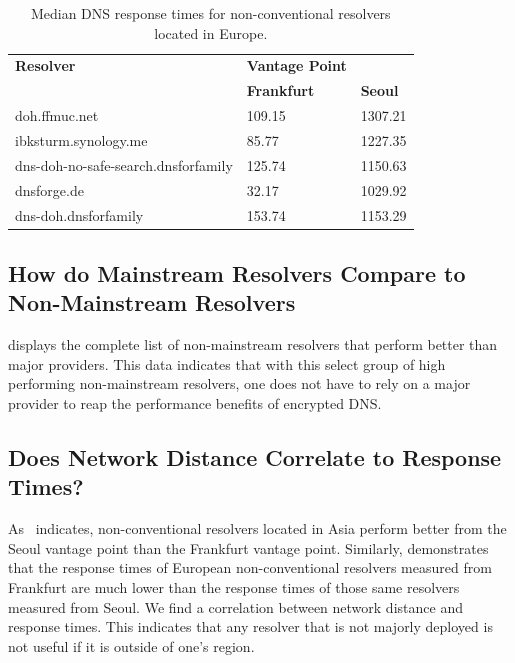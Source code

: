 \begin{table}
\centering
\begin{tabular}{lll}
\toprule
\textbf{Resolver} & \textbf{Vantage Point} & \\
                  & \textbf{Frankfurt}     & \textbf{Seoul} \\
\midrule
doh.ffmuc.net                               & 109.15                                           & 1307.21                         \\
ibksturm.synology.me                        & 85.77                                            & 1227.35                         \\
dns-doh-no-safe-search.dnsforfamily         & 125.74                                           & 1150.63                         \\
dnsforge.de                                 & 32.17                                            & 1029.92                         \\
dns-doh.dnsforfamily                        & 153.74                                           & 1153.29                         \\
\bottomrule
\end{tabular}
\caption{Median DNS response times for non-conventional resolvers located in Europe.}
\label{tab:UnconvEur}
\end{table}

\subsection{How do Mainstream Resolvers Compare to Non-Mainstream Resolvers}
\Fref{} displays the complete list of non-mainstream resolvers that perform better than major providers.
This data indicates that with this select group of high performing non-mainstream resolvers, one does not have to rely on a major provider to reap the performance benefits of encrypted DNS.  

\subsection{Does Network Distance Correlate to Response Times?}
As~ indicates, non-conventional resolvers located in Asia perform better from the Seoul vantage point than the Frankfurt vantage point. 
Similarly,  demonstrates that the response times of European non-conventional resolvers measured from Frankfurt are much lower than the response times of those same resolvers measured from Seoul. 
We find a correlation between network distance and response times.
This indicates that any resolver that is not majorly deployed is not useful if it is outside of one's region. 
